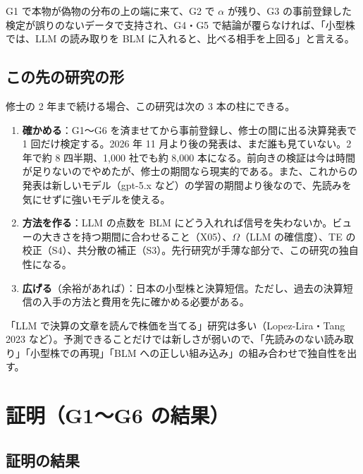 \documentclass[xelatex,ja=standard,jafont=haranoaji,a4paper,10pt]{bxjsreport}
\begin{document}
\begin{keybox}[証明と言える条件]
G1 で本物が偽物の分布の上の端に来て、G2 で $\alpha$ が残り、G3 の事前登録した検定が誤りのないデータで支持され、G4・G5 で結論が覆らなければ、「小型株では、LLM の読み取りを BLM に入れると、比べる相手を上回る」と言える。
\end{keybox}

\chapter{この先の研究の形}\label{ch:future}

修士の 2 年まで続ける場合、この研究は次の 3 本の柱にできる。

\begin{enumerate}
\item \textbf{確かめる}：G1〜G6 を済ませてから事前登録し、修士の間に出る決算発表で 1 回だけ検定する。2026 年 11 月より後の発表は、まだ誰も見ていない。2 年で約 8 四半期、1,000 社でも約 8,000 本になる。前向きの検証は今は時間が足りないのでやめたが、修士の期間なら現実的である。また、これからの発表は新しいモデル（gpt-5.x など）の学習の期間より後なので、先読みを気にせずに強いモデルを使える。
\item \textbf{方法を作る}：LLM の点数を BLM にどう入れれば信号を失わないか。ビューの大きさを持つ期間に合わせること（X05）、$\Omega$（LLM の確信度）、TE の校正（S4）、共分散の補正（S3）。先行研究が手薄な部分で、この研究の独自性になる。
\item \textbf{広げる}（余裕があれば）：日本の小型株と決算短信。ただし、過去の決算短信の入手の方法と費用を先に確かめる必要がある。
\end{enumerate}

「LLM で決算の文章を読んで株価を当てる」研究は多い（Lopez-Lira・Tang 2023 など）。予測できることだけでは新しさが弱いので、「先読みのない読み取り」「小型株での再現」「BLM への正しい組み込み」の組み合わせで独自性を出す。

\part{証明（G1〜G6 の結果）}

\chapter{証明の結果}\label{ch:proof}
\end{document}
